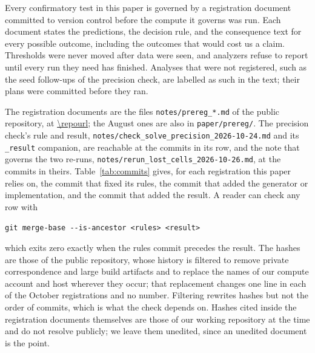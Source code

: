 Every confirmatory test in this paper is governed by a registration document
committed to version control before the compute it governs was run. Each
document states the predictions, the decision rule, and the consequence text
for every possible outcome, including the outcomes that would cost us a claim.
Thresholds were never moved after data were seen, and analyzers refuse to
report until every run they need has finished. Analyses that were not registered,
such as the seed follow-ups of the precision check, are labelled as such in
the text; their plans were committed before they ran.

The registration documents are the files \texttt{notes/prereg\_*.md} of the
public repository, at \url{\repourl}; the August ones are also in
\texttt{paper/prereg/}. The precision check's rule and result,
\texttt{notes/check\_solve\_precision\_2026-10-24.md} and its
\texttt{\_result} companion, are reachable at the commits in its row, and the
note that governs the two re-runs,
\texttt{notes/rerun\_lost\_cells\_2026-10-26.md}, at the commits in theirs.
Table~\ref{tab:commits} gives, for each registration this paper relies on, the
commit that fixed its rules, the commit that added the generator or
implementation, and the commit that added the result. A reader can check any
row with
\begin{center}
\texttt{git merge-base -{}-is-ancestor <rules> <result>}
\end{center}
which exits zero exactly when the rules commit precedes the result. The hashes
are those of the public repository, whose history is filtered to remove
private correspondence and large build artifacts and to replace the names of
our compute account and host wherever they occur; that replacement changes
one line in each of the October registrations and no number. Filtering
rewrites hashes but not the order of commits, which is what the check depends
on. Hashes cited inside the registration documents themselves are those of
our working repository at the time and do not resolve publicly; we leave them
unedited, since an unedited document is the point.

